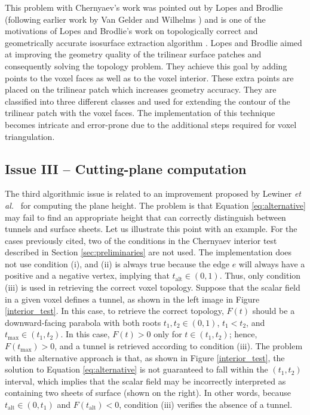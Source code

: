 This problem with Chernyaev's work was pointed out by Lopes and Brodlie \cite{lopes:tvcg:2003} (following earlier work by Van Gelder and Wilhelms \cite{Gelder94topologicalconsiderations}) and is one of the motivations of Lopes and Brodlie's work on topologically correct and geometrically accurate isosurface extraction algorithm \cite{lopes:tvcg:2003}. Lopes and Brodlie aimed at improving the geometry quality of the trilinear surface patches and consequently solving the topology problem. They achieve this goal by adding points to the voxel faces as well as to the voxel interior. These extra points are placed on the trilinear patch which increases geometry accuracy. They are classified into three different classes and used for extending the contour of the trilinear patch with the voxel faces. The implementation of this technique becomes intricate and error-prone due to the additional steps required for voxel triangulation. 


\subsection{Issue III -- Cutting-plane computation}

The third algorithmic issue is related to an \mc{} improvement proposed by Lewiner \emph{et al.}~\cite{Lewiner:2003} for computing the plane height.  
The problem is that Equation \eqref{eq:alternative} may fail to find an appropriate height  that can correctly distinguish between tunnels and surface sheets. Let us illustrate this point with an example. For the cases previously cited, two of the conditions in the Chernyaev interior test described in Section \ref{sec:preliminaries} are not used. The \mc{} implementation does not use condition (i), and (ii) is always true because the edge $e$ will always have a positive and a negative vertex, implying that $t_{\mathrm{alt}} \in (0,1)$. Thus, only condition (iii) is used in retrieving the correct voxel topology. Suppose that the scalar field in a given voxel defines a tunnel, as shown in the left image in Figure \ref{interior_test}. In this case, to retrieve the correct topology, $F(t)$ should be a downward-facing parabola with both roots $t_1, t_2 \in (0,1)$, $t_1 < t_2$, and $t_\mathrm{max} \in (t_1,t_2)$. In this case, $F(t) > 0$ only for $t \in (t_1, t_2)$; hence, $F(t_{\mathrm{max}}) > 0$, and a tunnel is retrieved according to condition (iii). The problem with the alternative approach is that, as shown in Figure \ref{interior_test}, the solution to Equation \eqref{eq:alternative} is not guaranteed to fall within  the $(t_1,t_2)$ interval, which implies that the scalar field may be incorrectly interpreted as containing two sheets of surface (shown on the right). In other words, because $t_{\mathrm{alt}} \in (0,t_1)$ and $F(t_{\mathrm{alt}}) < 0$, condition (iii) verifies the absence of a tunnel. 

